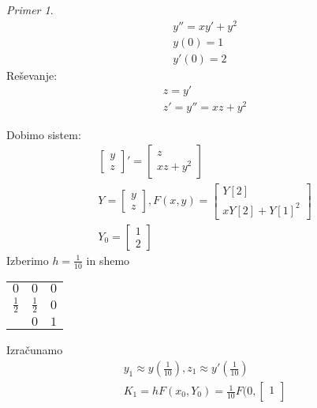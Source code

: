 \documentclass[a4paper,12pt]{article}
\theoremstyle{definition}
\theoremstyle{remark}
\newtheorem*{ex}{Primer}
\begin{document}
\begin{ex}
    \begin{gather*}
        y'' = xy' + y^2 \\
        y(0) = 1 \\
        y'(0) = 2
    \end{gather*}
    Reševanje:
    \begin{gather*}
        z = y' \\
        z' = y'' = xz + y^2
    \end{gather*}

    Dobimo sistem:
    \begin{gather*}
        \begin{bmatrix}
            y \\
            z
        \end{bmatrix}' = \begin{bmatrix}
            z \\
            xz + y^2
        \end{bmatrix} \\
        Y = \begin{bmatrix}
            y \\
            z
        \end{bmatrix}, F(x, y) = \begin{bmatrix}
            Y[2] \\
            x Y[2] + Y[1]^2
        \end{bmatrix} \\
        Y_0 = \begin{bmatrix}
            1 \\
            2
        \end{bmatrix}
    \end{gather*}
    Izberimo $h = \frac{1}{10}$ in shemo
    \begin{center}
        \begin{tabular}{c|c c}
            $0$ & $0$ & $0$ \\
            $\frac{1}{2}$ & $\frac{1}{2}$ & $0$ \\
            \hline
            & $0$ & $1$
        \end{tabular}
    \end{center}
    Izračunamo
    \begin{gather*}
        y_1 \approx y(\frac{1}{10}), z_1 \approx y'(\frac{1}{10}) \\
        K_1 = h F(x_0, Y_0) = \frac{1}{10} F(0, \begin{bmatrix}
            1 \\

\end{bmatrix}
\end{gather*}
\end{ex}
\end{document}
